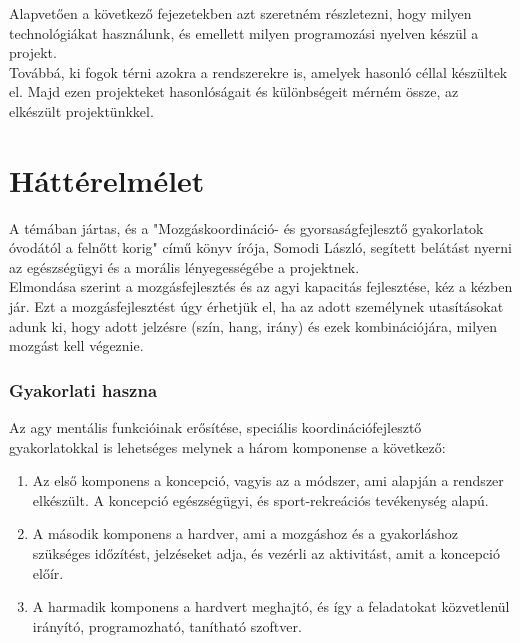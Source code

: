 \documentclass[tocnopagenum]{thesis-ekf}
\theoremstyle{definition}
\theoremstyle{remark}
\begin{document}
	Alapvetően a következő fejezetekben azt szeretném részletezni, hogy milyen technológiákat használunk, és emellett milyen programozási nyelven készül a projekt. \\ 
	Továbbá, ki fogok térni azokra a rendszerekre is, amelyek hasonló céllal készültek el. Majd ezen projekteket hasonlóságait és különbségeit mérném össze, az elkészült projektünkkel. 
	

	\chapter*{Háttérelmélet}
	\par
	A témában jártas, és a "Mozgáskoordináció- és gyorsaságfejlesztő gyakorlatok óvodától a felnőtt korig" \cite{SLaszlo} című könyv írója, Somodi László, segített belátást nyerni az egészségügyi és a morális lényegességébe a projektnek. \\ Elmondása szerint a mozgásfejlesztés és az agyi kapacitás fejlesztése, kéz a kézben jár. Ezt a mozgásfejlesztést úgy érhetjük el, ha az adott személynek utasításokat adunk ki, hogy adott jelzésre (szín, hang, irány) és ezek kombinációjára, milyen mozgást kell végeznie.
	\par 
	\subsection*{Gyakorlati haszna}
	Az agy mentális funkcióinak erősítése, speciális koordinációfejlesztő gyakorlatokkal is lehetséges melynek a három komponense a következő: 
	\begin{enumerate}
	 
			\item	Az első komponens a koncepció, vagyis az a módszer, ami alapján a rendszer elkészült. A koncepció egészségügyi, és sport-rekreációs tevékenység alapú.
			\item	A második komponens a hardver, ami a mozgáshoz és a gyakorláshoz szükséges időzítést, jelzéseket adja, és vezérli az aktivitást, amit a koncepció előír.
			\item	A harmadik komponens a hardvert meghajtó, és így a feladatokat közvetlenül irányító, programozható, tanítható szoftver.
	\end{enumerate}
\end{document}
